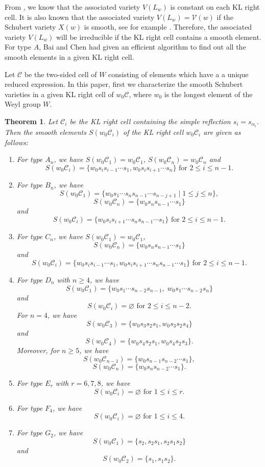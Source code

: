\documentclass[11pt, reqno]{amsart}
\newtheorem{Thm}{Theorem}[section]
\theoremstyle{definition}
\numberwithin{equation}{section}
\begin{document}
 

From \cite{Jo84}, we know that  the associated variety $V (L_w)$ is constant on each KL right cell.
It is also known that  the associated variety $V (L_w)=\mathcal{V}(w)$ if the Schubert variety $X(w)$ is smooth, see for example \cite[Cor. 4.3.2]{BoB3}.
Therefore, the associated variety $V (L_w)$ will be irreducible if the KL right  cell contains a smooth element. For type $A$, Bai and Chen \cite{Bchen} had given an efficient algorithm to find out all the smooth
elements in a given KL right cell.

Let $\mathcal{C}$ be the two-sided cell of $W$  consisting of elements which have a  a unique reduced expression.
In this paper, first we characterize  the smooth Schubert varieties in a given KL right cell of $w_0\mathcal{C}$, where $w_0$ is the longest element of the Weyl group $W$. 

\begin{Thm}\label{smcell}
    Let $\mathcal{C}_i$ be the KL  right cell containing the simple reflection $s_i=s_{\alpha_i}$. Then the smooth elements $S(w_0\mathcal{C}_i)$ of  the KL right cell $w_0\mathcal{C}_i$ are given as follows:
    \begin{enumerate}
        \item For type $A_{n}$, we have
$S(w_0\mathcal{C}_{1})=w_0\mathcal{C}_{1}$, $S(w_0\mathcal{C}_{n})=w_0\mathcal{C}_{n}$ and   $$S(w_0\mathcal{C}_{i})=\{w_0s_is_{i-1}\cdots s_{1},w_0s_is_{i+1}\cdots s_{n}\} \text{~for~} 2\leq i\leq n-1.$$
        \item For type $B_n$, we have $$S(w_0\mathcal{C}_1)=\{w_0s_1\cdots s_ns_{n-1}\cdots s_{n-j+1}\mid 1\leq j\leq n\},$$ $$S(w_0\mathcal{C}_n)=\{w_0s_ns_{n-1}\cdots s_1\}$$ and 
    $$S(w_0\mathcal{C}_i)=\{w_0s_is_{i+1}\cdots s_ns_{n-1}\cdots s_1\}\text{~for~}2\leq i\leq n-1.$$
        \item For type $C_n$, we have $S(w_0\mathcal{C}_1)=w_0\mathcal{C}_1$, $$S(w_0\mathcal{C}_n)=\{w_0s_ns_{n-1}\cdots s_1\}$$ and
    $$S(w_0\mathcal{C}_i)=\{w_0s_is_{i-1}\cdots s_1, w_0s_is_{i+1}\cdots s_ns_{n-1}\cdots s_{1}\}\text{~for~}2\leq i\leq n-1.$$
        \item  For type $D_n$ with $n\geq 4$, we have  
$$S(w_0\mathcal{C}_1)=\{w_0s_1\cdots s_{n-2}s_{n-1},\; w_0s_1\cdots s_{n-2}s_{n}\}$$ 
and $$S(w_0\mathcal{C}_{i})=\varnothing\text{~for~} 2\leq i\leq n-2.$$
For $n=4$, we have $$S(w_0\mathcal{C}_{3})=\{w_0s_{3}s_{2}s_1,w_0s_{3}s_{2}s_4\}$$ and  $$S(w_0\mathcal{C}_4)=\{w_0s_{4}s_{2} s_1,w_0s_{4}s_{2} s_3\}.$$
Moreover, for $n\geq 5$, we have $$S(w_0\mathcal{C}_{n-1})=\{w_0s_{n-1}s_{n-2}\cdots s_1\},$$ $$S(w_0\mathcal{C}_n)=\{w_0s_{n}s_{n-2}\cdots s_1\}.$$ 
        \item For type $E_r$ with $r=6,7,8$, we have
$$S(w_0\mathcal{C}_{i})=\varnothing\text{~for~} 1\leq i\leq r.$$
        \item For type $F_4$, we have $$S(w_0\mathcal{C}_{i})=\varnothing\text{~for~} 1\leq i\leq 4.$$
        \item For type $G_2$, we have 
$$S(w_0\mathcal{C}_{1})=\{s_{2},s_{2}s_1, s_2s_1s_2\}$$ and 
$$S(w_0\mathcal{C}_{2})=\{s_{1},s_{1}s_2\}.$$     
    \end{enumerate}
\end{Thm}
\end{document}
